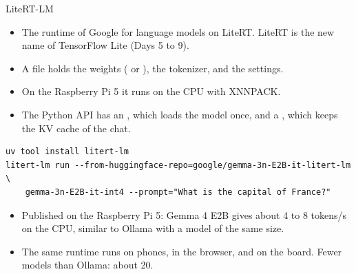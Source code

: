 \begin{frame}[fragile]{LiteRT-LM}
  \small
  \begin{itemize}
    \item The runtime of Google for language models on LiteRT. LiteRT is
          the new name of TensorFlow Lite (Days 5 to 9).
    \item A  file holds the weights ( or
          ), the tokenizer, and the settings.
    \item On the Raspberry Pi 5 it runs on the CPU with XNNPACK.
    \item The Python API has an , which loads the model once,
          and a , which keeps the KV cache of the chat.
  \end{itemize}
\begin{lstlisting}[style=shell]
uv tool install litert-lm
litert-lm run --from-huggingface-repo=google/gemma-3n-E2B-it-litert-lm \
    gemma-3n-E2B-it-int4 --prompt="What is the capital of France?"
\end{lstlisting}
  \begin{itemize}
    \item Published on the Raspberry Pi 5: Gemma 4 E2B gives about 4 to 8
          tokens/s on the CPU, similar to Ollama with a model of the same
          size.
    \item The same runtime runs on phones, in the browser, and on the
          board. Fewer models than Ollama: about 20.
  \end{itemize}
\end{frame}

